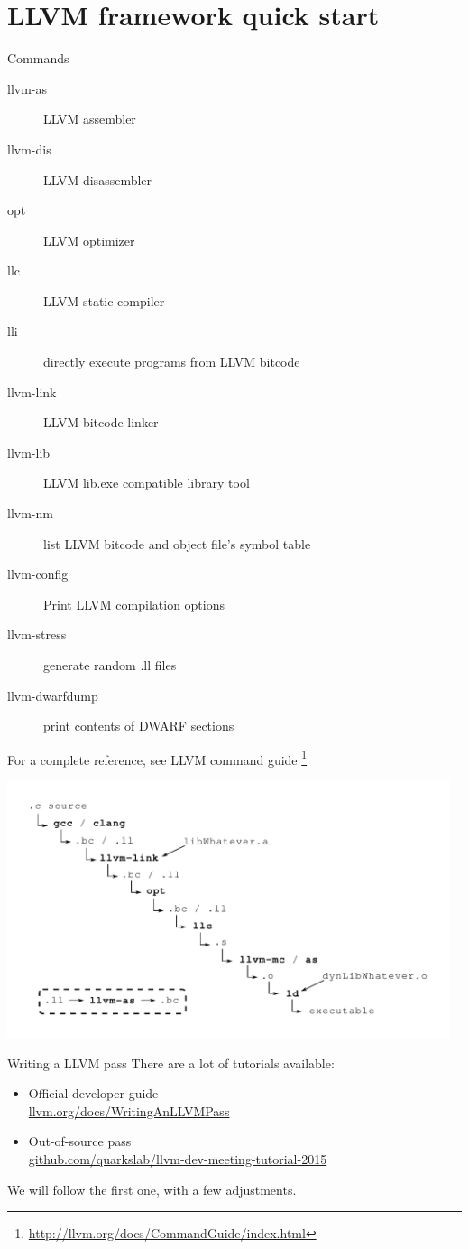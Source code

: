\documentclass[10pt,mathserif]{beamer}
\begin{document}
\section{LLVM framework quick start}
\begin{frame}{Commands}
	\begin{description}
		\item[llvm-as] LLVM assembler
		\item[llvm-dis] LLVM disassembler
		\item[opt] LLVM optimizer
		\item[llc] LLVM static compiler
		\item[lli] directly execute programs from LLVM bitcode
		\item[llvm-link] LLVM bitcode linker
		\item[llvm-lib] LLVM lib.exe compatible library tool
		\item[llvm-nm] list LLVM bitcode and object file's symbol table
		\item[llvm-config] Print LLVM compilation options
		\item[llvm-stress] generate random .ll files
		\item[llvm-dwarfdump] print contents of DWARF sections
	\end{description}
	\vfill
	For a complete reference, see LLVM command guide \footnote{\url{http://llvm.org/docs/CommandGuide/index.html}}
\end{frame}

\begin{frame}
	\noindent\hspace{-1.2cm}\includegraphics[width=13cm]{img/03/toolchain}
\end{frame}

\begin{frame}{Writing a LLVM pass}
	There are a lot of tutorials available:
	\vfill
	\begin{itemize}
		\item Official developer guide\\ \href{http://llvm.org/docs/WritingAnLLVMPass.html}{\url{llvm.org/docs/WritingAnLLVMPass}}
		\vfill
		\item Out-of-source pass\\ \href{https://github.com/quarkslab/llvm-dev-meeting-tutorial-2015}{\url{github.com/quarkslab/llvm-dev-meeting-tutorial-2015}}
	\end{itemize}
	\vfill
	We will follow the first one, with a few adjustments.
\end{frame}
\end{document}
